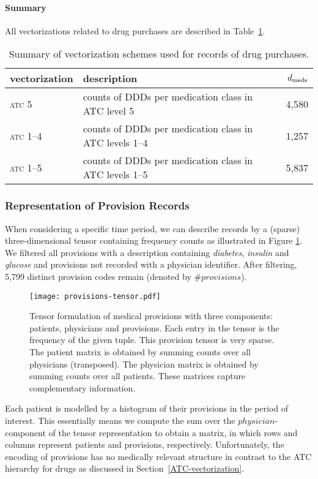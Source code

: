 \documentclass[twoside,11pt]{article}
\newcommand{\dmeds}{d_{\rm meds}}
\begin{document}
\paragraph{Summary} All vectorizations related to drug purchases are described in Table~\ref{table:meds-vects}.

\begin{table}[!h]
\centering
\begin{tabular}{llr}
\toprule
vectorization	 & description	 & $\dmeds$ \\
\midrule
\textsc{atc 5}		 & counts of DDDs per medication class in ATC level 5		& 4,580 \\
\textsc{atc 1--4}	 & counts of DDDs per medication class in ATC levels 1--4 	& 1,257 \\
\textsc{atc 1--5}	 & counts of DDDs per medication class in ATC levels 1--5 	& 5,837 \\
\bottomrule
\end{tabular}
\caption{Summary of vectorization schemes used for records of drug purchases.}
\label{table:meds-vects}
\end{table}

\subsubsection{Representation of Provision Records} \label{nomenclature}
When considering a specific time period, we can describe records by a (sparse) three-dimensional tensor containing frequency counts as illustrated in Figure \ref{fig:provisions-tensor}. We filtered all provisions with a description containing \emph{diabetes}, \emph{insulin} and \emph{glucose} and provisions not recorded with a physician identifier. After filtering, 5,799 distinct provision codes remain (denoted by $\# provisions$).

\begin{figure}[!h]
  \centering
  \texttt{[image: provisions-tensor.pdf]}
  \caption{Tensor formulation of medical provisions with three components: patients, physicians and provisions. Each entry in the tensor is the frequency of the given tuple. This provision tensor is very sparse. The patient matrix is obtained by summing counts over all physicians (transposed). The physician matrix is obtained by summing counts over all patients. These matrices capture complementary information.} 
  \label{fig:provisions-tensor}
\end{figure}

Each patient is modelled by a histogram of their provisions in the period of interest. This essentially means we compute the sum over the $physician$-component of the tensor representation to obtain a matrix, in which rows and columns represent patients and provisions, respectively. Unfortunately, the encoding of provisions has no medically relevant structure in contrast to the ATC hierarchy for drugs as discussed in Section~\ref{ATC-vectorization}.
\end{document}
